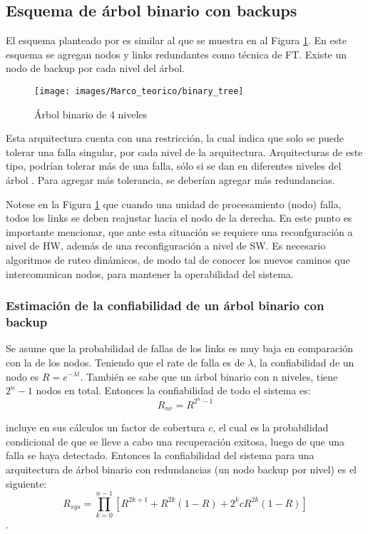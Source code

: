 \subsection{Esquema de árbol binario con backups}
El esquema planteado por \cite{Raghavendra84} es similar al que se muestra en al Figura 
\ref{fig:binary_tree}. En este esquema se agregan nodos y links redundantes como técnica de \ac{FT}. 
Existe un nodo de backup por cada nivel del árbol.

\begin{figure}[h]
 \centering
 \texttt{[image: images/Marco\_teorico/binary\_tree]}
  \caption{Árbol binario de 4 niveles}  
\label{fig:binary_tree} 
\end{figure}

Esta arquitectura cuenta con una restricción, la cual indica que solo se puede tolerar una 
falla singular, por cada nivel de la arquitectura. Arquitecturas de este tipo, podrían tolerar más 
de una falla, sólo si se dan en diferentes niveles del árbol \citep{Raghavendra84}. Para agregar 
más tolerancia, se deberían agregar más redundancias.

Notese en la Figura \ref{fig:binary_tree} que cuando una unidad de procesamiento (nodo) falla, 
todos los links se deben reajustar hacia el nodo de la derecha. En este punto es importante 
mencionar, que ante esta situación se requiere una reconfguración a nivel de \ac{HW}, además de una 
reconfiguración a nivel de \ac{SW}. Es necesario algoritmos de ruteo dinámicos, de modo tal de 
conocer los nuevos caminos que intercomunican nodos, para mantener la operabilidad del sistema.  

\subsubsection{Estimación de la confiabilidad de un árbol binario con backup}\label{subsec:conf_binary_tree}
Se asume que la probabilidad de fallas de los links es muy baja en comparación con la de los nodos. 
Teniendo que el rate de falla es de $\lambda$, la confiabilidad  de un nodo es $R = e^{-\lambda 
t}$. También se sabe que un árbol binario con n niveles,  tiene $2^n - 1$ nodos en total. 
Entonces la confiabilidad de todo el sistema es: $$R_{nr} = R^{2^n - 1}$$

\cite{Raghavendra84} incluye en sus cálculos un factor de cobertura $c$, el cual es la probabilidad 
condicional de que se lleve a cabo una recuperación exitosa, luego de que una falla se haya 
detectado. Entonces la confiabilidad del sistema para una arquitectura de árbol binario con 
redundancias (un nodo backup por nivel) es el siguiente: $$R_{sys} = \prod_{k=0}^{n-1}{[R^{2k +1} + 
R^{2k}(1-R) + 2^kcR^{2k}(1-R)]}$$.

